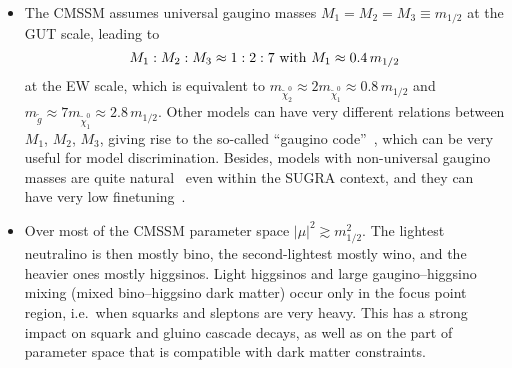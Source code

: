 \begin{itemize}

\item The CMSSM assumes universal gaugino masses $M_1=M_2=M_3\equiv m_{1/2}$ 
at the GUT scale, leading to 
\begin{equation}
  M_1 : M_2 : M_3 \approx 1 : 2 : 7 ~{\rm with}~ M_1 \approx 0.4\,m_{1/2}
  \label{eq:gauginos}
\end{equation}
at the EW scale, which is equivalent to 
$m_{\tilde\chi^0_2}\approx 2m_{\tilde\chi^0_1}\approx 0.8\,m_{1/2}$ 
and $m_{\tilde g}\approx 7m_{\tilde\chi^0_1}\approx 2.8\,m_{1/2}$. 
Other models can have very different relations between 
$M_1$, $M_2$, $M_3$, giving rise to the so-called 
``gaugino code''~\cite{Choi:2007ka}, 
which can be very useful for model discrimination. Besides, models with 
non-universal gaugino masses are quite natural~\cite{Martin:2009ad} even 
within the SUGRA context, and they can have very low finetuning~\cite{Horton:2009ed}.

\item Over most of the CMSSM parameter space $|\mu|^2\gtrsim m_{1/2}^2$. 
The lightest neutralino is then mostly bino, the second-lightest mostly wino, 
and the heavier ones mostly higgsinos. Light higgsinos and large gaugino--higgsino 
mixing (mixed bino--higgsino dark matter) occur only in the focus point region, 
i.e.\ when squarks and sleptons are very heavy. This has a strong impact on 
squark and gluino cascade decays, as well as on the part of parameter 
space that is compatible with dark matter constraints. 


\end{itemize}
